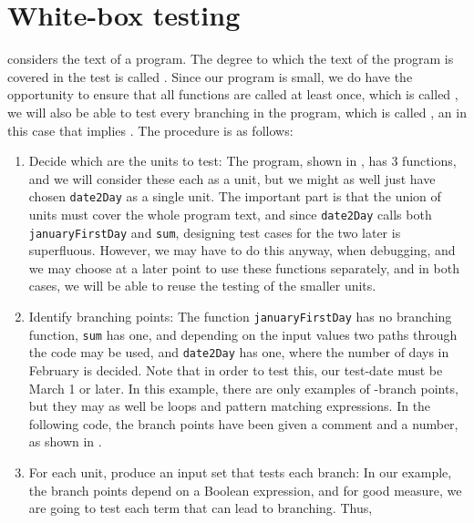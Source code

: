 \section{White-box testing}
 considers the text of a program. The degree to which the text of the program is covered in the test is called . Since our program is small, we do have the opportunity to ensure that all functions are called at least once, which is called , we will also be able to test every branching in the program, which is called , an in this case that implies . The procedure is as follows:
\begin{enumerate}
\item Decide which are the units to test: The program, shown in , has 3 functions, and we will consider these each as a unit, but we might as well just have chosen \lstinline!date2Day! as a single unit. The important part is that the union of units must cover the whole program text, and since \lstinline!date2Day! calls both \lstinline!januaryFirstDay! and \lstinline!sum!, designing test cases for the two later is superfluous. However, we may have to do this anyway, when debugging, and we may choose at a later point to use these functions separately, and in both cases, we will be able to reuse the testing of the smaller units.
\item Identify branching points: The function \lstinline!januaryFirstDay! has no branching function, \lstinline!sum! has one, and depending on the input values two paths through the code may be used, and \lstinline!date2Day! has one, where the number of days in February is decided. Note that in order to test this, our test-date must be March 1 or later. In this example, there are only examples of -branch points, but they may as well be loops and pattern matching expressions. In the following code, the branch points have been given a comment and a number, as shown in .
 \item For each unit, produce an input set that tests each branch: In our example, the branch points depend on a Boolean expression, and for good measure, we are going to test each term that can lead to branching. Thus,
   \begin{center}
     \begin{tabularx}{\linewidth}{|l|l|l|l|X|}

\end{tabularx}
\end{center}
\end{enumerate}
